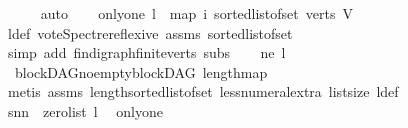 \begin{isabellebody}
\ \ \ \ \isamarkupfalse%
\ auto\isanewline
\ \ \isamarkupfalse%
\ only{\isacharunderscore}{\kern0pt}one{\isacharcolon}{\kern0pt}\ {\isachardoublequoteopen}l\ {\isacharequal}{\kern0pt}\ {\isacharparenleft}{\kern0pt}map\ {\isacharparenleft}{\kern0pt}{\isasymlambda}i{\isachardot}{\kern0pt}{}{\isacharparenright}{\kern0pt}\ {\isacharparenleft}{\kern0pt}sorted{\isacharunderscore}{\kern0pt}list{\isacharunderscore}{\kern0pt}of{\isacharunderscore}{\kern0pt}set\ {\isacharparenleft}{\kern0pt}verts\ V{\isacharparenright}{\kern0pt}{\isacharparenright}{\kern0pt}{\isacharparenright}{\kern0pt}{\isachardoublequoteclose}\isanewline
\ \ \ \ \isamarkupfalse%
\ l{\isacharunderscore}{\kern0pt}def\ vote{\isacharunderscore}{\kern0pt}Spectre{\isacharunderscore}{\kern0pt}reflexive\ assms\ sorted{\isacharunderscore}{\kern0pt}list{\isacharunderscore}{\kern0pt}of{\isacharunderscore}{\kern0pt}set{\isacharparenleft}{\kern0pt}{}{\isacharparenright}{\kern0pt}\isanewline
\ \ \ \ \isamarkupfalse%
\ {\isacharparenleft}{\kern0pt}simp\ add{\isacharcolon}{\kern0pt}\ fin{\isacharunderscore}{\kern0pt}digraph{\isachardot}{\kern0pt}finite{\isacharunderscore}{\kern0pt}verts\ subs{\isacharparenright}{\kern0pt}\isanewline
\ \ \isamarkupfalse%
\ ne{\isacharcolon}{\kern0pt}\ {\isachardoublequoteopen}l\ {\isasymnoteq}\ {\isacharbrackleft}{\kern0pt}{\isacharbrackright}{\kern0pt}{\isachardoublequoteclose}\isanewline
\ \ \ \ \isamarkupfalse%
\ \ blockDAG{\isachardot}{\kern0pt}no{\isacharunderscore}{\kern0pt}empty{\isacharunderscore}{\kern0pt}blockDAG\ length{\isacharunderscore}{\kern0pt}map\isanewline
\ \ \ \ \isamarkupfalse%
\ {\isacharparenleft}{\kern0pt}metis\ assms{\isacharparenleft}{\kern0pt}{}{\isacharparenright}{\kern0pt}\ length{\isacharunderscore}{\kern0pt}sorted{\isacharunderscore}{\kern0pt}list{\isacharunderscore}{\kern0pt}of{\isacharunderscore}{\kern0pt}set\ less{\isacharunderscore}{\kern0pt}numeral{\isacharunderscore}{\kern0pt}extra{\isacharparenleft}{\kern0pt}{}{\isacharparenright}{\kern0pt}\ list{\isachardot}{\kern0pt}size{\isacharparenleft}{\kern0pt}{}{\isacharparenright}{\kern0pt}\ l{\isacharunderscore}{\kern0pt}def{\isacharparenright}{\kern0pt}\isanewline
\ \ \isamarkupfalse%
\ \isamarkupfalse%
\ snn{\isacharcolon}{\kern0pt}\ {\isachardoublequoteopen}{\isasymnot}\ zero{\isacharunderscore}{\kern0pt}list\ l{\isachardoublequoteclose}\ \isamarkupfalse%
\ only{\isacharunderscore}{\kern0pt}one\isanewline

\end{isabellebody}

